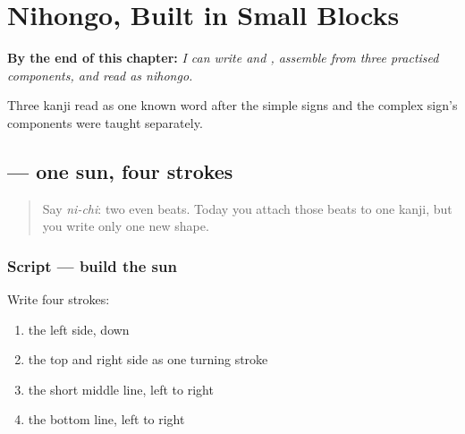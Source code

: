 
\chapter{Nihongo, Built in Small Blocks}
\label{ch:ja-nihongo-kanji}

\begin{chapteropening}
\textbf{By the end of this chapter:} \emph{I can write  and , assemble  from three practised components, and read  as nihongo.}

Three kanji read as one known word after the simple signs and the complex sign's components were taught separately.
\end{chapteropening}

\section[\texorpdfstring{\ja{日} (nichi)}{日 (nichi)}]{ — one sun, four strokes}

\label{lesson:JA-W05-nichi-kanji}



\begin{quote}
Say \emph{ni-chi}: two even beats. Today you attach those beats to one kanji, but you write only one new shape.
\end{quote}

\subsection*{Script — build the sun}

\begin{quote}
\end{quote}

Write four strokes:

\begin{enumerate}
\raggedright
  \item the left side, down
  \item the top and right side as one turning stroke
  \item the short middle line, left to right
  \item the bottom line, left to right
\end{enumerate}

